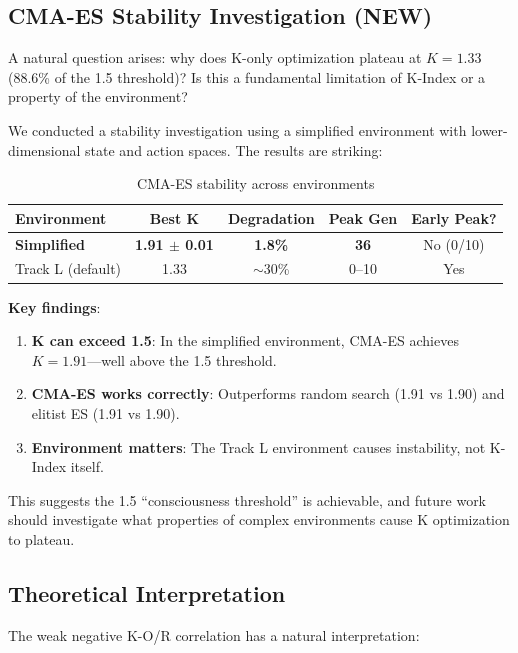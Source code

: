 \documentclass[twoside]{article}
\theoremstyle{remark}
\begin{document}
\subsection{CMA-ES Stability Investigation (NEW)}

A natural question arises: why does K-only optimization plateau at $K = 1.33$ (88.6\% of the 1.5 threshold)? Is this a fundamental limitation of K-Index or a property of the environment?

We conducted a stability investigation using a simplified environment with lower-dimensional state and action spaces. The results are striking:

\begin{table}[h]
\centering
\caption{CMA-ES stability across environments}
\label{tab:stability}
\begin{tabular}{@{}lcccc@{}}
\toprule
\textbf{Environment} & \textbf{Best K} & \textbf{Degradation} & \textbf{Peak Gen} & \textbf{Early Peak?} \\
\midrule
\textbf{Simplified} & \textbf{1.91 $\pm$ 0.01} & \textbf{1.8\%} & \textbf{36} & No (0/10) \\
Track L (default) & 1.33 & $\sim$30\% & 0--10 & Yes \\
\bottomrule
\end{tabular}
\end{table}

\textbf{Key findings}:
\begin{enumerate}
    \item \textbf{K can exceed 1.5}: In the simplified environment, CMA-ES achieves $K = 1.91$---well above the 1.5 threshold.
    \item \textbf{CMA-ES works correctly}: Outperforms random search (1.91 vs 1.90) and elitist ES (1.91 vs 1.90).
    \item \textbf{Environment matters}: The Track L environment causes instability, not K-Index itself.
\end{enumerate}

This suggests the 1.5 ``consciousness threshold'' is achievable, and future work should investigate what properties of complex environments cause K optimization to plateau.

\subsection{Theoretical Interpretation}

The weak negative K-O/R correlation has a natural interpretation:
\end{document}
